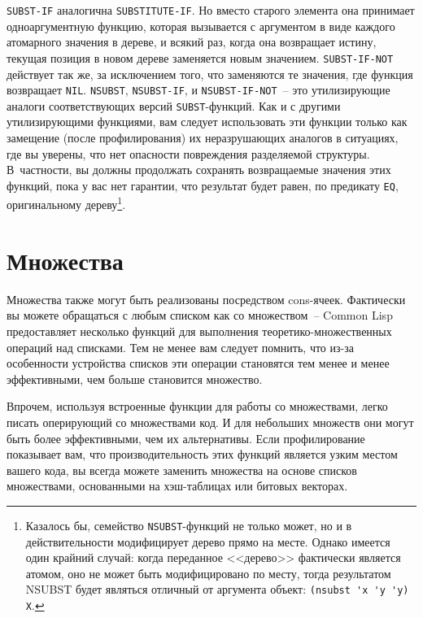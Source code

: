 \lstinline{SUBST-IF} аналогична \lstinline{SUBSTITUTE-IF}. Но вместо старого элемента она принимает
одноаргументную функцию, которая вызывается с аргументом в виде каждого атомарного
значения в дереве, и всякий раз, когда она возвращает истину, текущая позиция в новом
дереве заменяется новым значением. \lstinline{SUBST-IF-NOT} действует так же, за исключением
того, что заменяются те значения, где функция возвращает \lstinline{NIL}. \lstinline{NSUBST},
\lstinline{NSUBST-IF}, и \lstinline{NSUBST-IF-NOT}~-- это утилизирующие аналоги соответствующих
версий \lstinline{SUBST}-функций. Как и с другими утилизирующими функциями, вам следует
использовать эти функции только как замещение (после профилирования) их неразрушающих
аналогов в ситуациях, где вы уверены, что нет опасности повреждения разделяемой
структуры. В~частности, вы должны продолжать сохранять возвращаемые значения этих функций,
пока у вас нет гарантии, что результат будет равен, по предикату \lstinline{EQ}, оригинальному
дереву\footnote{Казалось бы, семейство \lstinline{NSUBST}-функций не только может, но и в
  действительности модифицирует дерево прямо на месте. Однако имеется один крайний случай:
  когда переданное <<дерево>> фактически является атомом, оно не может быть модифицировано
  по месту, тогда результатом NSUBST будет являться отличный от аргумента объект:
  \lstinline!(nsubst 'x 'y 'y) X!.}\hspace{\footnotenegspace}.

\section{Множества}

Множества также могут быть реализованы посредством cons-ячеек. Фактически вы можете
обращаться с любым списком как со множеством~-- Common Lisp предоставляет несколько функций
для выполнения теоретико-множественных операций над списками. Тем не менее вам следует
помнить, что из-за особенности устройства списков эти операции становятся тем менее и
менее эффективными, чем больше становится множество.

Впрочем, используя встроенные функции для работы со множествами, легко писать оперирующий со
множествами код. И для небольших множеств они могут быть более эффективными, чем их
альтернативы. Если профилирование показывает вам, что производительность этих функций
является узким местом вашего кода, вы всегда можете заменить множества на основе списков
множествами, основанными на хэш-таблицах или битовых векторах.

